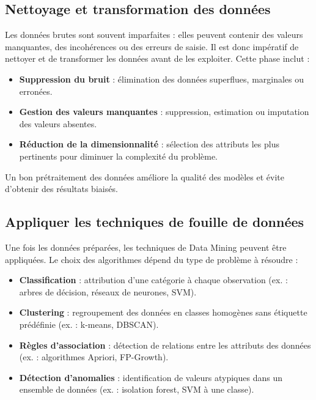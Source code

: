 \documentclass{article}
\begin{document}
     \subsection{Nettoyage et transformation des données}

         Les données brutes sont souvent imparfaites : elles peuvent contenir des valeurs manquantes, des incohérences ou des erreurs de saisie. Il est donc impératif de nettoyer et de transformer les données avant de les exploiter. Cette phase inclut :
         \begin{itemize}
             \item \textbf{Suppression du bruit} : élimination des données superflues, marginales ou erronées.
    
            \item \textbf{Gestion des valeurs manquantes} : suppression, estimation ou imputation des valeurs absentes.
    
             \item \textbf{Réduction de la dimensionnalité} : sélection des attributs les plus pertinents pour diminuer la complexité du problème.
         \end{itemize}
         
    
         Un bon prétraitement des données améliore la qualité des modèles et évite d’obtenir des résultats biaisés.

     \subsection{Appliquer les techniques de fouille de données}

         Une fois les données préparées, les techniques de Data Mining peuvent être appliquées. Le choix des algorithmes dépend du type de problème à résoudre :
    
         \begin{itemize}
             \item \textbf{Classification} : attribution d’une catégorie à chaque observation (ex. : arbres de décision, réseaux de neurones, SVM).
        
             \item \textbf{Clustering} : regroupement des données en classes homogènes sans étiquette prédéfinie (ex. : k-means, DBSCAN).
        
             \item \textbf{Règles d’association} : détection de relations entre les attributs des données (ex. : algorithmes Apriori, FP-Growth).
        
             \item \textbf{Détection d’anomalies} : identification de valeurs atypiques dans un ensemble de données (ex. : isolation forest, SVM à une classe).
         \end{itemize}
    
\end{document}
